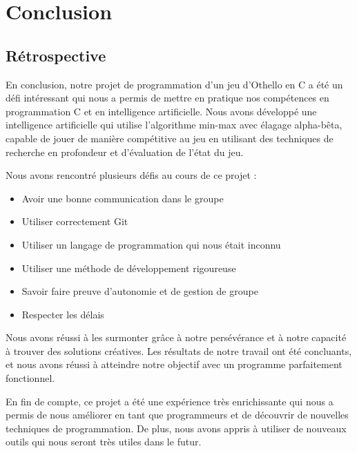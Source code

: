 \documentclass{article}
\begin{document}
\section{Conclusion}
\subsection{Rétrospective}

En conclusion, notre projet de programmation d'un jeu d'Othello en C a été un défi intéressant qui nous a permis de mettre en pratique nos compétences en programmation C et en intelligence artificielle. Nous avons développé une intelligence artificielle qui utilise l'algorithme min-max avec élagage alpha-bêta, capable de jouer de manière compétitive au jeu en utilisant des techniques de recherche en profondeur et d'évaluation de l'état du jeu.

Nous avons rencontré plusieurs défis au cours de ce projet :
\begin{itemize}
\item Avoir une bonne communication dans le groupe
\item Utiliser correctement Git
\item Utiliser un langage de programmation qui nous était inconnu
\item Utiliser une méthode de développement rigoureuse
\item Savoir faire preuve d'autonomie et de gestion de groupe
\item Respecter les délais
\end{itemize}

Nous avons réussi à les surmonter grâce à notre persévérance et à notre capacité à trouver des solutions créatives. Les résultats de notre travail ont été concluants, et nous avons réussi à atteindre notre objectif avec un programme parfaitement fonctionnel.

En fin de compte, ce projet a été une expérience très enrichissante qui nous a permis de nous améliorer en tant que programmeurs et de découvrir de nouvelles techniques de programmation. De plus, nous avons appris à utiliser de nouveaux outils qui nous seront très utiles dans le futur.
\end{document}
